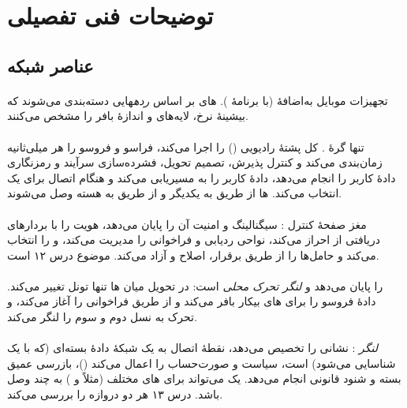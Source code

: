 \documentclass[11pt,a4paper]{article}
\begin{document}
\section{توضیحات فنی تفصیلی}

\subsection{عناصر شبکه}
\paragraph{} تجهیزات موبایل به‌اضافهٔ  (با برنامهٔ ). های
 بر اساس \emph{رده}هایی دسته‌بندی می‌شوند که بیشینهٔ نرخ، لایه‌های  و اندازهٔ
بافر را مشخص می‌کنند.

\paragraph{} تنها گرهٔ  \cite{ts36300}. کل پشتهٔ رادیویی () را اجرا می‌کند، فراسو و فروسو را هر میلی‌ثانیه زمان‌بندی می‌کند و کنترل پذیرش، تصمیم
تحویل، فشرده‌سازی سرآیند و رمزنگاری دادهٔ کاربر را انجام می‌دهد، دادهٔ کاربر را به  مسیریابی
می‌کند و هنگام اتصال برای  یک  انتخاب می‌کند. ها از طریق  به
یکدیگر و از طریق  به هسته وصل می‌شوند.

\paragraph{} مغز صفحهٔ کنترل : سیگنالینگ  و امنیت آن را پایان می‌دهد،
هویت  را با بردارهای دریافتی از  احراز می‌کند، نواحی ردیابی و فراخوانی را مدیریت
می‌کند،  و  را انتخاب می‌کند و حامل‌ها را از طریق  برقرار، اصلاح و آزاد
می‌کند. موضوع درس ۱۲ است.

\paragraph{}  را پایان می‌دهد و \emph{لنگر تحرک محلی} است: در تحویل میان ها
تنها تونل  تغییر می‌کند. دادهٔ فروسو را برای های بیکار بافر می‌کند و از طریق 
فراخوانی را آغاز می‌کند، و تحرک به نسل دوم و سوم را لنگر می‌کند.

\paragraph{} \emph{لنگر }: نشانی   را تخصیص می‌دهد، نقطهٔ اتصال به یک
شبکهٔ دادهٔ بسته‌ای (که با یک  شناسایی می‌شود) است، سیاست و صورت‌حساب را اعمال می‌کند
()، بازرسی عمیق بسته و شنود قانونی انجام می‌دهد. یک  می‌تواند برای های
مختلف (مثلاً  و ) به چند  وصل باشد. درس ۱۳ هر دو دروازه
را بررسی می‌کند.
\end{document}

